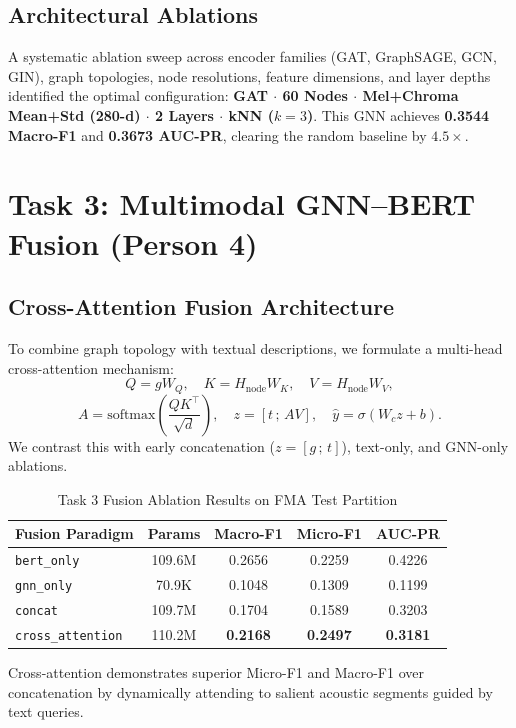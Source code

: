 \documentclass{article}
\begin{document}
\subsection{Architectural Ablations}
A systematic ablation sweep across encoder families (GAT, GraphSAGE, GCN, GIN), graph topologies, node resolutions, feature dimensions, and layer depths identified the optimal configuration:
\textbf{GAT $\cdot$ 60 Nodes $\cdot$ Mel+Chroma Mean+Std (280-d) $\cdot$ 2 Layers $\cdot$ kNN ($k=3$)}.
This GNN achieves \textbf{0.3544 Macro-F1} and \textbf{0.3673 AUC-PR}, clearing the random baseline by $4.5\times$.

\section{Task 3: Multimodal GNN–BERT Fusion (Person 4)}
\subsection{Cross-Attention Fusion Architecture}
To combine graph topology with textual descriptions, we formulate a multi-head cross-attention mechanism:
$$Q = g W_Q, \quad K = H_{\text{node}} W_K, \quad V = H_{\text{node}} W_V,$$
$$A = \text{softmax}\left(\frac{Q K^\top}{\sqrt{d}}\right), \quad z = [t \,;\, A V], \quad \hat{y} = \sigma(W_c z + b).$$
We contrast this with early concatenation ($z = [g \,;\, t]$), text-only, and GNN-only ablations.

\begin{table}[t]
\caption{Task 3 Fusion Ablation Results on FMA Test Partition}
\centering
\begin{tabular}{lcccc}
\toprule
\textbf{Fusion Paradigm} & \textbf{Params} & \textbf{Macro-F1} & \textbf{Micro-F1} & \textbf{AUC-PR} \\
\midrule
\texttt{bert\_only} & 109.6M & 0.2656 & 0.2259 & 0.4226 \\
\texttt{gnn\_only} & 70.9K & 0.1048 & 0.1309 & 0.1199 \\
\texttt{concat} & 109.7M & 0.1704 & 0.1589 & 0.3203 \\
\texttt{cross\_attention} & 110.2M & \textbf{0.2168} & \textbf{0.2497} & \textbf{0.3181} \\
\bottomrule
\end{tabular}
\label{tab:fusion}
\end{table}

Cross-attention demonstrates superior Micro-F1 and Macro-F1 over concatenation by dynamically attending to salient acoustic segments guided by text queries.
\end{document}
